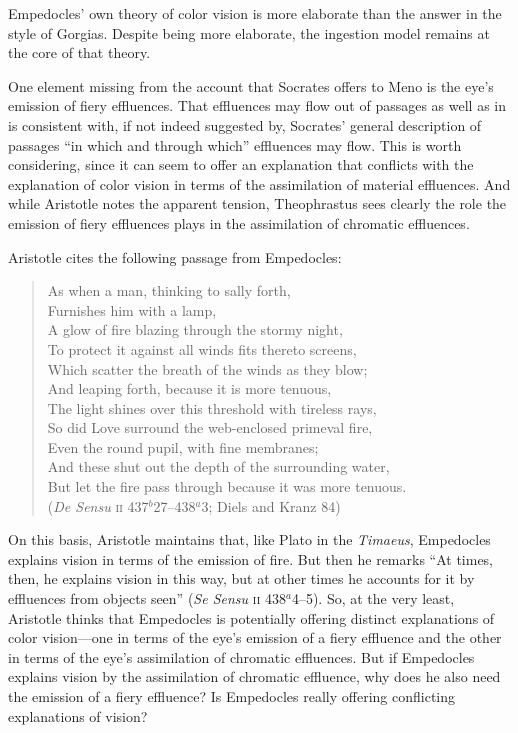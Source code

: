 Empedocles' own theory of color vision is more elaborate than the answer in the style of Gorgias. Despite being more elaborate, the ingestion model remains at the core of that theory. 

One element missing from the account that Socrates offers to Meno is the eye's emission of fiery effluences. That effluences may flow out of passages as well as in is consistent with, if not indeed suggested by, Socrates' general description of passages ``in which and through which'' effluences may flow. This is worth considering, since it can seem to offer an explanation that conflicts with the explanation of color vision in terms of the assimilation of material effluences. And while Aristotle notes the apparent tension, Theophrastus sees clearly the role the emission of fiery effluences plays in the assimilation of chromatic effluences.

Aristotle cites the following passage from Empedocles:
\begin{verse}
	As when a man, thinking to sally forth,\\
	Furnishes him with a lamp,\\
	A glow of fire blazing through the stormy night,\\
	To protect it against all winds fits thereto screens,\\
	Which scatter the breath of the winds as they blow;\\
	And leaping forth, because it is more tenuous,\\
	The light shines over this threshold with tireless rays,\\
	So did Love surround the web-enclosed primeval fire,\\
	Even the round pupil, with fine membranes;\\
	And these shut out the depth of the surrounding water,\\
	But let the fire pass through because it was more tenuous.\\
	(\emph{De Sensu} \textsc{ii} 437\( ^{b} \)27--438\( ^{a} \)3; Diels and Kranz 84)
\end{verse}
On this basis, Aristotle maintains that, like Plato in the \emph{Timaeus}, Empedocles explains vision in terms of the emission of fire. But then he remarks ``At times, then, he explains vision in this way, but at other times he accounts for it by effluences from objects seen'' (\emph{Se Sensu} \textsc{ii} 438\( ^{a} \)4--5). So, at the very least, Aristotle thinks that Empedocles is potentially offering distinct explanations of color vision---one in terms of the eye's emission of a fiery effluence and the other in terms of the eye's assimilation of chromatic effluences. But if Empedocles explains vision by the assimilation of chromatic effluence, why does he also need the emission of a fiery effluence? Is Empedocles really offering conflicting explanations of vision? 

